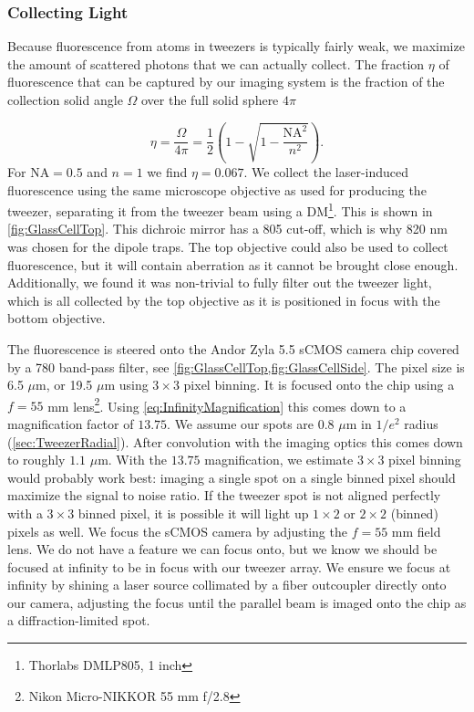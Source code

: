 \subsubsection*{Collecting Light}

Because fluorescence from atoms in tweezers is typically fairly weak, we maximize the amount of scattered photons that we can actually collect. 
The fraction $\eta$ of fluorescence that can be captured by our imaging system is the fraction of the collection solid angle $\Omega$ over the full solid sphere $4\pi$

\begin{equation}\label{eq:Collection}
    \eta = \frac{\Omega}{4\pi} = 
    \frac{1}{2}\left(1-\sqrt{1-\frac{\text{NA}^2}{n^2}}\right).
\end{equation}
For $\text{NA}=0.5$ and $n=1$ we find $\eta =0.067$. 
We collect the laser-induced fluorescence using the same microscope objective as used for producing the tweezer, separating it from the tweezer beam using a \ac{DM}\footnote{Thorlabs DMLP805, 1 inch}.
This is shown in \cref{fig:GlassCellTop}.
This dichroic mirror has a 805 cut-off, which is why 820 nm was chosen for the dipole traps.
The top objective could also be used to collect fluorescence, but it will contain aberration as it cannot be brought close enough. 
Additionally, we found it was non-trivial to fully filter out the tweezer light, which is all collected by the top objective as it is positioned in focus with the bottom objective. 

The fluorescence is steered onto the Andor Zyla 5.5 sCMOS camera chip covered by a 780 band-pass filter, see \cref{fig:GlassCellTop,fig:GlassCellSide}.
The pixel size is 6.5 $\mu$m, or 19.5 $\mu$m using $3\times3$ pixel binning. 
It is focused onto the chip using a $f= 55$ mm lens\footnote{Nikon Micro-NIKKOR 55 mm f/2.8}.
Using \cref{eq:InfinityMagnification} this comes down to a magnification factor of $13.75$.
We assume our spots are $0.8$ $\mu$m in $1/e^2$ radius (\cref{sec:TweezerRadial}).
After convolution with the imaging optics this comes down to roughly $1.1$ $\mu$m.
With the $13.75$ magnification, we estimate $3\times3$ pixel binning would probably work best: imaging a single spot on a single binned pixel should maximize the signal to noise ratio. 
If the tweezer spot is not aligned perfectly with a $3\times3$ binned pixel, it is possible it will light up $1\times2$ or $2\times2$ (binned) pixels as well.
We focus the sCMOS camera by adjusting the $f=55$ mm field lens.
We do not have a feature we can focus onto, but we know we should be focused at infinity to be in focus with our tweezer array. 
We ensure we focus at infinity by shining a laser source collimated by a fiber outcoupler directly onto our camera, adjusting the focus until the parallel beam is imaged onto the chip as a diffraction-limited spot. 

